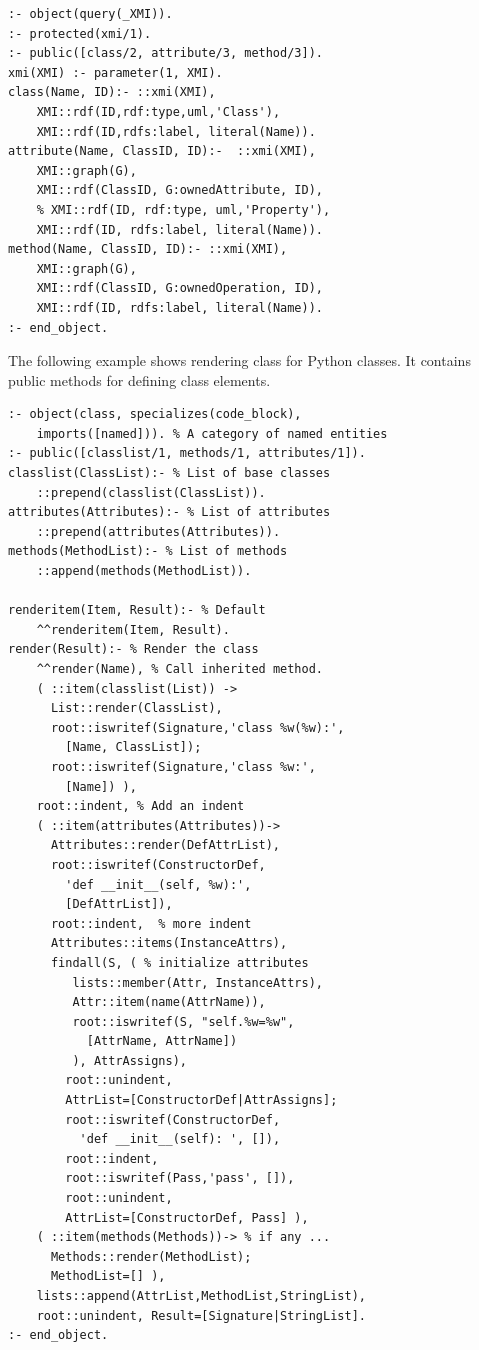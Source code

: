 \documentclass[conference]{IEEEtran}
\begin{document}
\begin{verbatim}
:- object(query(_XMI)).
:- protected(xmi/1).
:- public([class/2, attribute/3, method/3]).
xmi(XMI) :- parameter(1, XMI).
class(Name, ID):- ::xmi(XMI),
    XMI::rdf(ID,rdf:type,uml,'Class'),
    XMI::rdf(ID,rdfs:label, literal(Name)).
attribute(Name, ClassID, ID):-  ::xmi(XMI),
    XMI::graph(G),
    XMI::rdf(ClassID, G:ownedAttribute, ID),
    % XMI::rdf(ID, rdf:type, uml,'Property'),
    XMI::rdf(ID, rdfs:label, literal(Name)).
method(Name, ClassID, ID):- ::xmi(XMI),
    XMI::graph(G),
    XMI::rdf(ClassID, G:ownedOperation, ID),
    XMI::rdf(ID, rdfs:label, literal(Name)).
:- end_object.
\end{verbatim}

The following example shows rendering class for Python classes. It contains public methods for defining class elements.

\begin{verbatim}
:- object(class, specializes(code_block),
    imports([named])). % A category of named entities
:- public([classlist/1, methods/1, attributes/1]).
classlist(ClassList):- % List of base classes
    ::prepend(classlist(ClassList)).
attributes(Attributes):- % List of attributes
    ::prepend(attributes(Attributes)).
methods(MethodList):- % List of methods
    ::append(methods(MethodList)).

renderitem(Item, Result):- % Default
    ^^renderitem(Item, Result).
render(Result):- % Render the class
    ^^render(Name), % Call inherited method.
    ( ::item(classlist(List)) ->
      List::render(ClassList),
      root::iswritef(Signature,'class %w(%w):',
        [Name, ClassList]);
      root::iswritef(Signature,'class %w:',
        [Name]) ),
    root::indent, % Add an indent
    ( ::item(attributes(Attributes))->
      Attributes::render(DefAttrList),
      root::iswritef(ConstructorDef,
        'def __init__(self, %w):',
        [DefAttrList]),
      root::indent,  % more indent
      Attributes::items(InstanceAttrs),
      findall(S, ( % initialize attributes
         lists::member(Attr, InstanceAttrs),
         Attr::item(name(AttrName)),
         root::iswritef(S, "self.%w=%w",
           [AttrName, AttrName])
         ), AttrAssigns),
        root::unindent,
        AttrList=[ConstructorDef|AttrAssigns];
        root::iswritef(ConstructorDef,
          'def __init__(self): ', []),
        root::indent,
        root::iswritef(Pass,'pass', []),
        root::unindent,
        AttrList=[ConstructorDef, Pass] ),
    ( ::item(methods(Methods))-> % if any ...
      Methods::render(MethodList);
      MethodList=[] ),
    lists::append(AttrList,MethodList,StringList),
    root::unindent, Result=[Signature|StringList].
:- end_object.
\end{verbatim}
\end{document}

